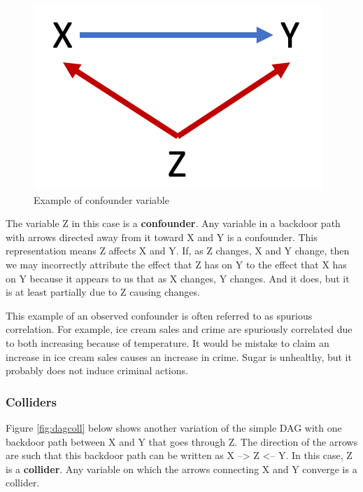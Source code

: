 \documentclass[
]{book}
\begin{document}
\begin{figure}

{\centering \includegraphics[width=\textwidth]{images/dag_confound} 

}

\caption{Example of confounder variable}\label{fig:dagconf}
\end{figure}

The variable Z in this case is a \textbf{confounder}. Any variable in a backdoor path with arrows directed away from it toward X and Y is a confounder. This representation means Z affects X and Y. If, as Z changes, X and Y change, then we may incorrectly attribute the effect that Z has on Y to the effect that X has on Y because it appears to us that as X changes, Y changes. And it does, but it is at least partially due to Z causing changes.

This example of an observed confounder is often referred to as spurious correlation. For example, ice cream sales and crime are spuriously correlated due to both increasing because of temperature. It would be mistake to claim an increase in ice cream sales causes an increase in crime. Sugar is unhealthy, but it probably does not induce criminal actions.

\hypertarget{colliders}{%
\subsubsection*{Colliders}\label{colliders}}


Figure \ref{fig:dagcoll} below shows another variation of the simple DAG with one backdoor path between X and Y that goes through Z. The direction of the arrows are such that this backdoor path can be written as X --\textgreater{} Z \textless-- Y. In this case, Z is a \textbf{collider}. Any variable on which the arrows connecting X and Y converge is a collider.
\end{document}
